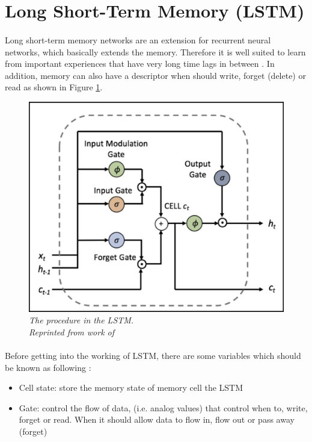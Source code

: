 \section{Long Short-Term Memory (LSTM)}
\paragraph{}
Long short-term memory networks are an extension for recurrent neural networks, which basically extends the memory. Therefore it is well suited to learn from important experiences that have very long time lags in between \cite{donges_2019,olah_2015}. In addition, memory can also have a descriptor when should write, forget (delete) or read as shown in  Figure \ref{fig:LSTM}.

\begin{figure}[H]
  \centering
  \caption[The procedure inside the LSTM.]{\emph{The procedure in the LSTM. \\ Reprinted from work of \citeauthor{sirinart_tangruamsub_2017} \citeyear{sirinart_tangruamsub_2017}}}\label{fig:LSTM}
  \includegraphics[scale = 0.3]{figures/LSTM.jpg}  
\end{figure}

\paragraph{}
Before getting into the working of LSTM, there are some variables which should be known as following \cite{sirinart_tangruamsub_2017}:
\begin{itemize}
\item Cell state: store the memory state of memory cell the LSTM
\item Gate: control the flow of data, (i.e. analog values) that control when to, write, forget or read. When it should allow data to flow in, flow out or pass away (forget)
\end{itemize}
